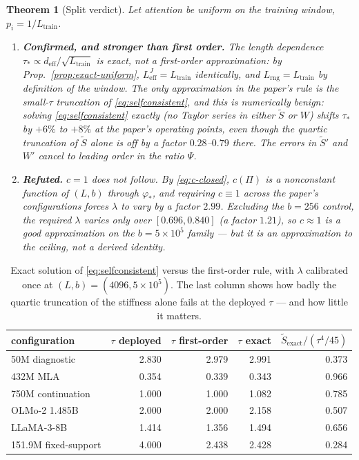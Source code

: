 \documentclass[11pt]{article}
\newtheorem{theorem}{Theorem}[section]
\theoremstyle{definition}
\newcommand{\deff}{d_{\mathrm{eff}}}
\newcommand{\Ltr}{L_{\mathrm{train}}}
\newcommand{\Leff}{L_{\mathrm{eff}}^{J}}
\begin{document}
\begin{theorem}[Split verdict]\label{thm:verdict}
Let attention be uniform on the training window, $p_i=1/\Ltr$.
\begin{enumerate}
\item[\textup{(a)}] \textbf{Confirmed, and stronger than first order.} The length dependence
$\tau_*\propto\deff/\sqrt{\Ltr}$ is \emph{exact}, not a first-order approximation:
by Prop.~\ref{prop:exact-uniform}, $\Leff=\Ltr$ identically, and $L_{\mathrm{rng}}=\Ltr$ by
definition of the window. The only approximation in the paper's rule is the small-$\tau$
truncation of \eqref{eq:selfconsistent}, and this is numerically benign: solving
\eqref{eq:selfconsistent} exactly (no Taylor series in either $\tilde S$ or $W$) shifts $\tau_*$ by
$+6\%$ to $+8\%$ at the paper's operating points, even though the quartic truncation of $\tilde S$
alone is off by a factor $0.28$--$0.79$ there. The errors in $\tilde S'$ and $W'$ cancel to leading
order in the ratio $\Psi$.
\item[\textup{(b)}] \textbf{Refuted.} $c=1$ does \emph{not} follow. By \eqref{eq:c-closed},
$c(\Pi)$ is a nonconstant function of $(L,b)$ through $\varphi_*$, and requiring $c\equiv1$ across
the paper's configurations forces $\lambda$ to vary by a factor $2.99$. Excluding the $b{=}256$
control, the required $\lambda$ varies only over $[0.696,0.840]$ (a factor $1.21$), so
$c\approx1$ is a good approximation on the $b{=}5{\times}10^5$ family --- but it is an
approximation to the ceiling, not a derived identity.
\end{enumerate}
\end{theorem}

\begin{table}[t]\centering\small
\caption{Exact solution of \eqref{eq:selfconsistent} versus the first-order rule, with $\lambda$
calibrated once at $(L,b)=(4096,5{\times}10^5)$. The last column shows how badly the quartic
truncation of the stiffness alone fails at the deployed $\tau$ --- and how little it matters.}
\label{tab:exact}
\begin{tabular}{lrrrr}
\toprule
configuration & $\tau$ deployed & $\tau$ first-order & $\tau$ exact & $\tilde S_{\text{exact}}/(\tau^4/45)$\\
\midrule
50M diagnostic       & 2.830 & 2.979 & 2.991 & 0.373\\
432M MLA             & 0.354 & 0.339 & 0.343 & 0.966\\
750M continuation    & 1.000 & 1.000 & 1.082 & 0.785\\
OLMo-2 1.485B        & 2.000 & 2.000 & 2.158 & 0.507\\
LLaMA-3-8B           & 1.414 & 1.356 & 1.494 & 0.656\\
\midrule
151.9M fixed-support & 4.000 & 2.438 & 2.428 & 0.284\\
\bottomrule
\end{tabular}
\end{table}
\end{document}
